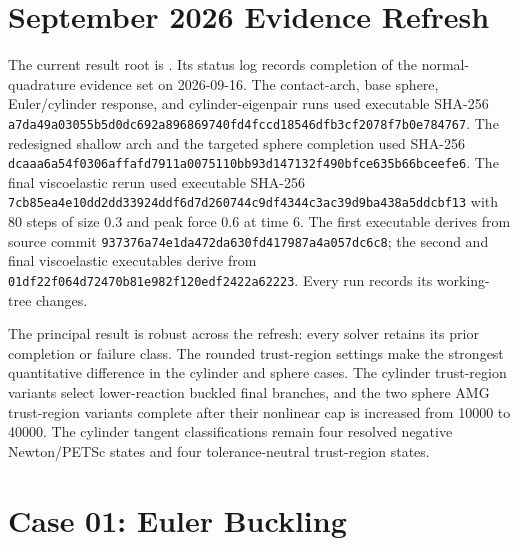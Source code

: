 \documentclass[11pt]{article}
\newcommand{\sha}[2]{\texttt{#1}\allowbreak\texttt{#2}}
\begin{document}
\section*{September 2026 Evidence Refresh}

The current result root is
.
Its status log records completion of the normal-quadrature evidence set on
2026-09-16.  The contact-arch, base sphere, Euler/cylinder response, and
cylinder-eigenpair runs used executable SHA-256
\sha{a7da49a03055b5d0dc692a896869740f}{d4fccd18546dfb3cf2078f7b0e784767}.
The redesigned shallow arch and the targeted sphere completion used SHA-256
\sha{dcaaa6a54f0306affafd7911a0075110}{bb93d147132f490bfce635b66bceefe6}.
The final viscoelastic rerun used executable SHA-256
\sha{7cb85ea4e10dd2dd33924ddf6d7d2607}{44c9df4344c3ac39d9ba438a5ddcbf13}
with 80 steps of size 0.3 and peak force 0.6 at time 6. The first executable
derives from source commit \texttt{937376a74e1da472da630fd417987a4a057dc6c8};
the second and final viscoelastic executables derive from
\texttt{01df22f064d72470b81e982f120edf2422a62223}. Every run records its
working-tree changes.

The principal result is robust across the refresh: every solver
retains its prior completion or failure class.  The rounded trust-region
settings make the strongest quantitative difference in the cylinder and sphere
cases.  The cylinder trust-region variants select lower-reaction buckled final
branches, and the two sphere AMG trust-region variants complete after their
nonlinear cap is increased from 10000 to 40000.  The cylinder tangent classifications
remain four resolved negative Newton/PETSc states and four tolerance-neutral
trust-region states.

\section*{Case 01: Euler Buckling}
\end{document}
